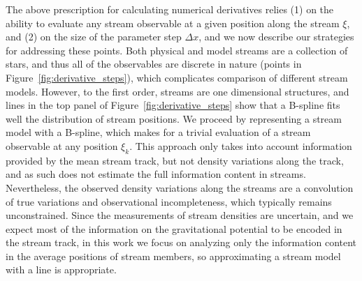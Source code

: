 \documentclass[modern]{aastex62}
\begin{document}
The above prescription for calculating numerical derivatives relies (1) on the ability to evaluate any stream observable at a given position along the stream $\xi$, and (2) on the size of the parameter step $\Delta x$, and we now describe our strategies for addressing these points.
Both physical and model streams are a collection of stars, and thus all of the observables are discrete in nature (points in Figure~\ref{fig:derivative_steps}), which complicates comparison of different stream models.
However, to the first order, streams are one dimensional structures, and lines in the top panel of Figure~\ref{fig:derivative_steps} show that a B-spline fits well the distribution of stream positions.
We proceed by representing a stream model with a B-spline, which makes for a trivial evaluation of a stream observable at any position $\xi_k$.
This approach only takes into account information provided by the mean stream track, but not density variations along the track, and as such does not estimate the full information content in streams.
Nevertheless, the observed density variations along the streams are a convolution of true variations and observational incompleteness, which typically remains unconstrained.
Since the measurements of stream densities are uncertain, and we expect most of the information on the gravitational potential to be encoded in the stream track, in this work we focus on analyzing only the information content in the average positions of stream members, so approximating a stream model with a line is appropriate.
\end{document}
